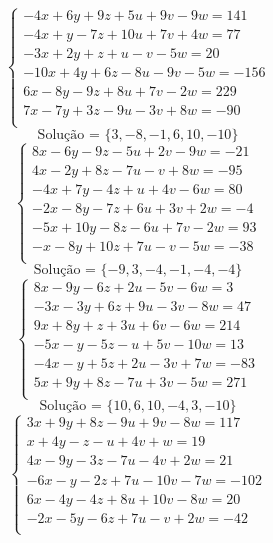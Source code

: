\documentclass[12pt,oneside,a4paper]{article}
\begin{document}
\vspace{\baselineskip}
\begin{equation*}
\begin{cases}
-4x+6y+9z+5u+9v-9w=141 \\
-4x+y-7z+10u+7v+4w=77 \\
-3x+2y+z+u-v-5w=20 \\
-10x+4y+6z-8u-9v-5w=-156 \\
6x-8y-9z+8u+7v-2w=229 \\
7x-7y+3z-9u-3v+8w=-90 \\
\end{cases}
\end{equation*}
\begin{equation*}
\text{Solução = }\{3,-8,-1,6,10,-10\}
\end{equation*}
\vspace{\baselineskip}
\begin{equation*}
\begin{cases}
8x-6y-9z-5u+2v-9w=-21 \\
4x-2y+8z-7u-v+8w=-95 \\
-4x+7y-4z+u+4v-6w=80 \\
-2x-8y-7z+6u+3v+2w=-4 \\
-5x+10y-8z-6u+7v-2w=93 \\
-x-8y+10z+7u-v-5w=-38 \\
\end{cases}
\end{equation*}
\begin{equation*}
\text{Solução = }\{-9,3,-4,-1,-4,-4\}
\end{equation*}
\vspace{\baselineskip}
\begin{equation*}
\begin{cases}
8x-9y-6z+2u-5v-6w=3 \\
-3x-3y+6z+9u-3v-8w=47 \\
9x+8y+z+3u+6v-6w=214 \\
-5x-y-5z-u+5v-10w=13 \\
-4x-y+5z+2u-3v+7w=-83 \\
5x+9y+8z-7u+3v-5w=271 \\
\end{cases}
\end{equation*}
\begin{equation*}
\text{Solução = }\{10,6,10,-4,3,-10\}
\end{equation*}
\vspace{\baselineskip}
\begin{equation*}
\begin{cases}
3x+9y+8z-9u+9v-8w=117 \\
x+4y-z-u+4v+w=19 \\
4x-9y-3z-7u-4v+2w=21 \\
-6x-y-2z+7u-10v-7w=-102 \\
6x-4y-4z+8u+10v-8w=20 \\
-2x-5y-6z+7u-v+2w=-42 \\
\end{cases}
\end{equation*}
\end{document}
